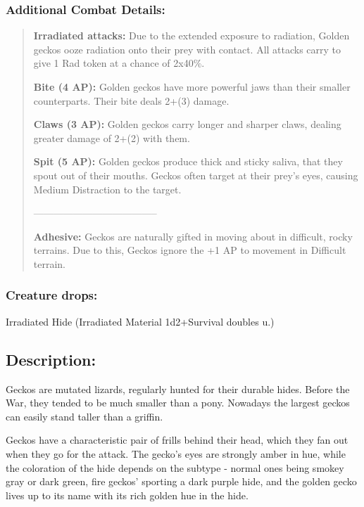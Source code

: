 \documentclass[11pt,a4paper,twocolumn]{book}
\begin{document}
	\subsubsection*{Additional Combat Details:}
	\begin{verse}
		\textbf{Irradiated attacks:} Due to the extended exposure to radiation, Golden geckos ooze radiation onto their prey with contact. All attacks carry to give 1 Rad token at a chance of 2x40\%.
		
		\textbf{Bite (4 AP):} Golden geckos have more powerful jaws than their smaller counterparts. Their bite deals 2+(3) damage. 
		
		\textbf{Claws (3 AP):} Golden geckos carry longer and sharper claws, dealing greater damage of 2+(2) with them.
		
		\textbf{Spit (5 AP):}  Golden geckos produce thick and sticky saliva, that they spout out of their mouths. Geckos often target at their prey's eyes, causing Medium Distraction to the target.
		
		--------------------------------------
		
		\textbf{Adhesive:} Geckos are naturally gifted in moving about in difficult, rocky terrains. Due to this, Geckos ignore the +1 AP to movement in Difficult terrain.

	\end{verse}
	
	\subsubsection*{Creature drops:}
	Irradiated Hide (Irradiated Material 1d2+Survival doubles u.)
	
	
	
	
	
	\subsection*{Description:}
	Geckos are mutated lizards, regularly hunted for their durable hides. Before the War, they tended to be much smaller than a pony. Nowadays the largest geckos can easily stand taller than a griffin.
	
	Geckos have a characteristic pair of frills behind their head, which they fan out when they go for the attack. The gecko's eyes are strongly amber in hue, while the coloration of the hide depends on the subtype - normal ones being smokey gray or dark green, fire geckos' sporting a dark purple hide, and the golden gecko lives up to its name with its rich golden hue in the hide. 
	
\end{document}
